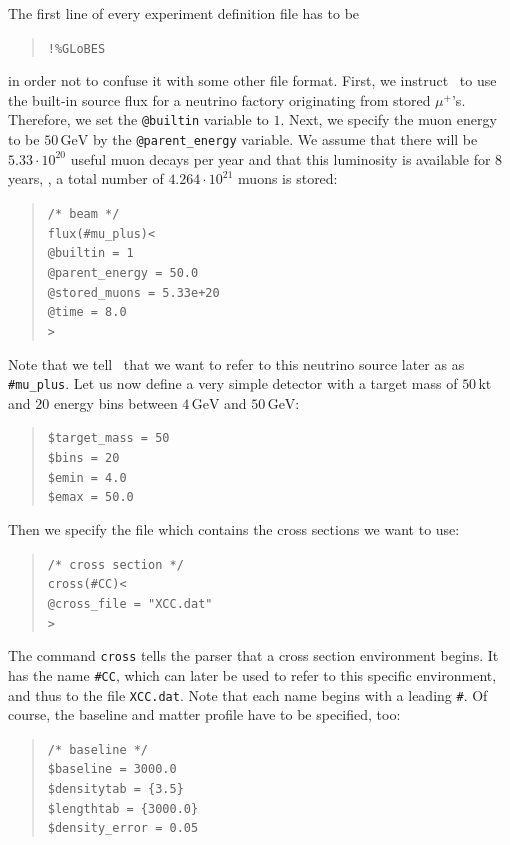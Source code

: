 The first line of every experiment definition file has to be
\begin{quote}
{\tt !\%GLoBES}
\end{quote}
in order not to confuse it with some other file format.
%
First, we instruct \GLOBES\ to use the built-in source flux for a neutrino factory
originating from stored $\mu^+$'s. Therefore, we set the {\tt @builtin} variable to $1$. Next, we specify the muon energy to be $50\,\mathrm{GeV}$ by the {\tt @parent\_energy} variable. We assume 
that there will be $5.33\cdot 10^{20}$ useful muon decays per year
and that this luminosity is available for $8$ years, \ie , a total number
of $ 4.264\cdot10^{21}$ muons is stored:
\begin{quote}
{\tt /* beam */}\\
{\tt flux(\#mu\_plus)<\\
\tb  @builtin = 1\\
\tb  @parent\_energy = 50.0\\
\tb  @stored\_muons = 5.33e+20\\
\tb  @time = 8.0\\
>}\\
\end{quote}
Note that we tell \GLOBES\ that we want to refer to this neutrino source later as as {\tt \#mu\_plus}. 
%
Let us now define a very simple detector with a target mass 
of $50\,\mathrm{kt}$ and $20$ energy bins between
$4\,\mathrm{GeV}$ and $50\,\mathrm{GeV}$: 
\begin{quote}
{\tt \$target\_mass = 50}\\
{\tt \$bins = 20}\\
{\tt \$emin = 4.0}\\
{\tt \$emax = 50.0}
\end{quote}
Then we specify the file which contains the cross sections we want to 
use:
\begin{quote}
{\tt /* cross section */}\\
{\tt cross(\#CC)<}\\
{\tt \tb @cross\_file = "XCC.dat"}\\
{\tt >}
\end{quote}
The command {\tt cross} tells the parser that a cross section environment
begins. It has the name {\tt \#CC}, which can later be used to refer 
to this specific environment, and thus to the file {\tt XCC.dat}. Note that each name begins with a leading {\tt \#}.
%
Of course, the baseline and matter profile have to be specified, too:
\begin{quote}
{\tt /* baseline */}\\
{\tt \$baseline = 3000.0}\\
{\tt \$densitytab = \{3.5\}}\\
{\tt \$lengthtab = \{3000.0\}}\\
{\tt \$density\_error = 0.05}
\end{quote}
